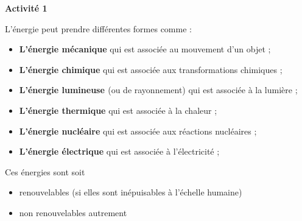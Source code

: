 \documentclass[10pt]{article}
\begin{document}
\thispagestyle{fancy}
\cfoot{}



\begin{mybox}{\textbf{Activité 1}}
    \setlength\parindent{4pt} %
    \setlength\parskip{5pt} 

    L’énergie peut prendre différentes formes comme :
    \begin{itemize}
        \item \textbf{\color{DarkRed} {L’énergie mécanique}} qui est associée au mouvement d’un objet ;
        \item \textbf{\color{DarkRed} {L’énergie chimique}} qui est associée aux transformations chimiques ;
        \item \textbf{\color{DarkRed} {L’énergie lumineuse }}(ou de rayonnement) qui est associée à la lumière ;
        \item \textbf{\color{DarkRed} {L’énergie thermique}} qui est associée à la chaleur ;
        \item \textbf{\color{DarkRed} {L’énergie nucléaire}} qui est associée aux réactions nucléaires ;
        \item \textbf{\color{DarkRed} {L’énergie électrique}} qui est associée à l'électricité ;
    \end{itemize}

    Ces énergies sont soit \begin{itemize}
        \item renouvelables (si elles sont inépuisables à l'échelle humaine)
        \item non renouvelables autrement
    \end{itemize}

\end{mybox}

\vspace{-5pt}
\end{document}
